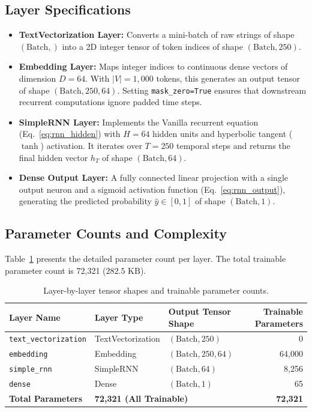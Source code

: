 \documentclass[11pt,a4paper]{article}
\begin{document}
\subsection{Layer Specifications}
\begin{itemize}
    \item \textbf{TextVectorization Layer:} Converts a mini-batch of raw strings of shape $(\text{Batch},)$ into a 2D integer tensor of token indices of shape $(\text{Batch}, 250)$.
    \item \textbf{Embedding Layer:} Maps integer indices to continuous dense vectors of dimension $D = 64$. With $|V| = 1,000$ tokens, this generates an output tensor of shape $(\text{Batch}, 250, 64)$. Setting \texttt{mask\_zero=True} ensures that downstream recurrent computations ignore padded time steps.
    \item \textbf{SimpleRNN Layer:} Implements the Vanilla recurrent equation (Eq.~\ref{eq:rnn_hidden}) with $H = 64$ hidden units and hyperbolic tangent ($\tanh$) activation. It iterates over $T = 250$ temporal steps and returns the final hidden vector $h_T$ of shape $(\text{Batch}, 64)$.
    \item \textbf{Dense Output Layer:} A fully connected linear projection with a single output neuron and a sigmoid activation function (Eq.~\ref{eq:rnn_output}), generating the predicted probability $\hat{y} \in [0, 1]$ of shape $(\text{Batch}, 1)$.
\end{itemize}

\subsection{Parameter Counts and Complexity}
Table~\ref{tab:param_counts} presents the detailed parameter count per layer. The total trainable parameter count is 72,321 ($282.5\text{ KB}$).

\begin{table}[H]
\centering
\begin{tabular}{lllr}
\toprule
\textbf{Layer Name} & \textbf{Layer Type} & \textbf{Output Tensor Shape} & \textbf{Trainable Parameters} \\
\midrule
\texttt{text\_vectorization} & TextVectorization & $(\text{Batch}, 250)$ & 0 \\
\texttt{embedding}          & Embedding         & $(\text{Batch}, 250, 64)$ & 64,000 \\
\texttt{simple\_rnn}        & SimpleRNN         & $(\text{Batch}, 64)$ & 8,256 \\
\texttt{dense}              & Dense             & $(\text{Batch}, 1)$ & 65 \\
\midrule
\textbf{Total Parameters}   & \multicolumn{2}{l}{\textbf{72,321 (All Trainable)}} & \textbf{72,321} \\
\bottomrule
\end{tabular}
\caption{Layer-by-layer tensor shapes and trainable parameter counts.}
\label{tab:param_counts}
\end{table}
\end{document}
